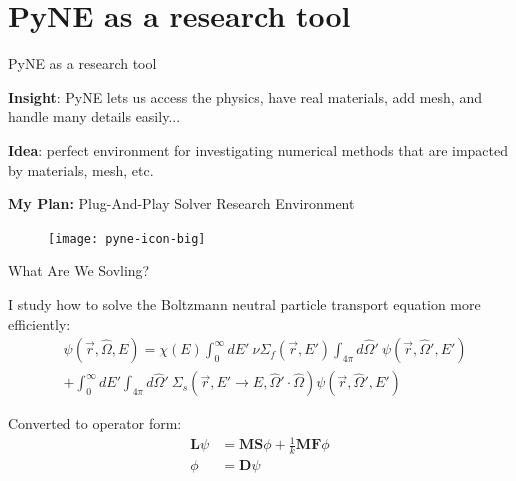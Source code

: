 \documentclass[xcolor=x11names,compress]{beamer}
\renewcommand{\(}{\begin{columns}}
\renewcommand{\)}{\end{columns}}
\newcommand{\<}[1]{\begin{column}{#1}}
\renewcommand{\>}{\end{column}}
\newcommand{\Macro}{\ensuremath{\Sigma}}
\newcommand{\vOmega}{\ensuremath{\hat{\Omega}}}
\begin{document}
\section{PyNE as a research tool}  
\begin{frame}{PyNE as a research tool}

    \textbf{Insight}: PyNE lets us access the physics, have real materials, 
    add mesh, and handle many details easily...
    
    \vspace{1 em}
    \textbf{Idea}: perfect environment for investigating numerical methods that 
    are impacted by materials, mesh, etc. 
    
    \vspace{1 em}
    \textbf{My Plan:} Plug-And-Play Solver Research Environment

 	\begin{figure}
    \texttt{[image: pyne-icon-big]}
	\end{figure}
    
\end{frame}

\begin{frame}{What Are We Sovling?}

    I study how to solve the Boltzmann neutral particle transport equation
    more efficiently:
    \begin{align}
    [\vOmega \cdot \nabla + \Macro(\vec{r}, E)] &\psi(\vec{r}, \vOmega, E)  = 
     \chi(E)   \int_0^{\infty} dE' \:\nu \Macro_{f}(\vec{r}, E') \int_{4\pi} d\vOmega'
     \:\psi(\vec{r}, \vOmega', E')  \nonumber \\
     &+ \int_0^{\infty} dE' \int_{4\pi} d\vOmega' \:\Macro_{s}(\vec{r}, E' \to E,
     \vOmega' \cdot \vOmega) \psi(\vec{r}, \vOmega', E')  \nonumber
    \end{align}

    Converted to operator form:
    \begin{align}
    \mathbf{L} \psi &= \mathbf{MS}\phi + \frac{1}{k}\mathbf{MF}\phi \nonumber\\
    \phi &= \mathbf{D}\psi \nonumber
    \end{align}

\end{frame}
\end{document}
